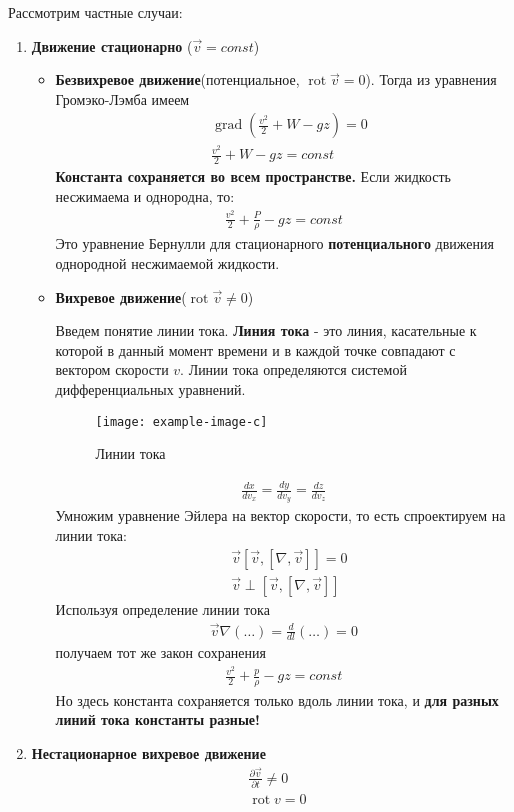Рассмотрим частные случаи:
\begin{enumerate}
	\item {\textbf{Движение стационарно} ($\vec{v}=const$)}
	\begin{itemize}
		\item {\textbf{Безвихревое движение}(потенциальное, $\operatorname { rot } \vec{v}=0$).
		Тогда из уравнения Громэко-Лэмба имеем
		\begin{align*}
		& \operatorname { grad } \left( \frac { v ^ { 2 } } { 2 } + W - g z \right) = 0 \\
		& \frac { v ^ { 2 } } { 2 } + W - g z = const
		\end{align*}
		\textbf{Константа сохраняется во всем пространстве.} Если жидкость несжимаема и однородна, то:
		\begin{align*}
		\frac { v ^ { 2 } } { 2 } + \frac { P } { \rho } - g z = const
		\end{align*}
		Это уравнение Бернулли для стационарного \textbf{потенциального} движения однородной несжимаемой жидкости.
		}
		\item {\textbf{Вихревое движение}($\operatorname { rot } \vec{v} \neq 0$)

		Введем понятие линии тока. \textbf{Линия тока} - это линия, касательные к которой в данный момент времени и в каждой точке совпадают с вектором скорости $v$.  Линии тока определяются системой дифференциальных уравнений.
		\begin{figure}[H]
			\centering
			\texttt{[image: example-image-c]}
			\caption{Линии тока}
			\label{fig:figure6}
		\end{figure}
		\begin{align*}
		\frac { d x } { d v _ { x } } = \frac { d y } { d v _ { y } } = \frac { d z } { d v _ { z } }
		\end{align*}
		Умножим уравнение Эйлера на вектор скорости, то есть спроектируем на линии тока:
		\begin{align*}
		& \vec {v}[ \vec { v } , [\nabla , \vec { v } ]]=0 \\
		& \vec {v} \perp [ \vec { v } , [\nabla , \vec { v } ]]
		\end{align*}
		Используя определение линии тока
		\begin{align*}
		\vec { v } \nabla ( \ldots ) = \frac { d } { d l } ( \ldots ) = 0
		\end{align*}
		получаем тот же закон сохранения
		\begin{align*}
		\frac { v ^ { 2 } } { 2 } + \frac { p } { \rho } - g z = const
		\end{align*}
		Но здесь константа сохраняется только вдоль линии тока, и \textbf{для разных линий тока константы разные!}
		}
		\end{itemize}
	\item {\textbf{Нестационарное вихревое движение}
	\begin{align*}
	& \frac { \partial \vec { v } } { \partial t } \neq 0 \\
	& \operatorname { rot } v = 0
	\end{align*}

}
\end{enumerate}
